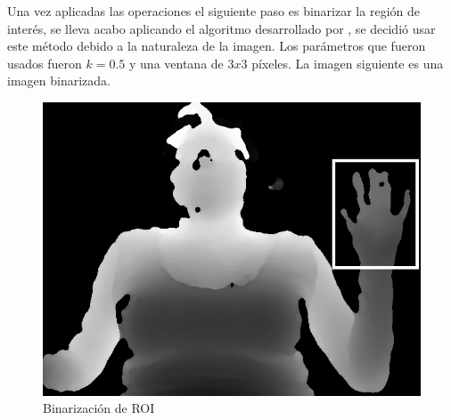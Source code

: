Una vez aplicadas las operaciones el siguiente paso es binarizar la región de interés, se lleva acabo aplicando el algoritmo desarrollado por \citep{Niblack1985}, se decidió usar este método debido a la naturaleza de la imagen. Los parámetros que fueron usados fueron $k=0.5$ y una ventana de $3x3$ p\'ixeles. La imagen siguiente es una imagen binarizada. 

\begin{figure}[!h]
\begin{center}
\includegraphics[scale=.5]{./Figures/roi.png}
\end{center}
\caption{Binarización de ROI}
\label{fig:BinarizationRoi}
\end{figure}
 


